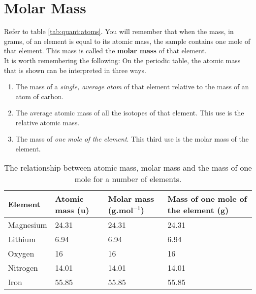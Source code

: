 



\section{Molar Mass}
\label{subsec:quant:mm}


Refer to table \ref{tab:quant:atoms}. You will remember that when the mass, in grams, of an element is equal to its atomic mass, the sample contains one mole of that element. This mass is called the \textbf{molar mass} of that element.\\

It is worth remembering the following: On the periodic table, the atomic mass that is shown can be interpreted in three ways.

\begin{enumerate}
\item{The mass of a \textit{single, average atom} of that element relative to the mass of an atom of carbon.}
\item{The average atomic mass of all the isotopes of that element. This use is the relative atomic mass.}
\item{The mass of \textit{one mole of the element}. This third use is the molar mass of the element.}
\end{enumerate}

\begin{table}[h]
\caption{The relationship between atomic mass, molar mass and the mass of one mole for a number of elements.}
\label{tab:mole summary}
\begin{center}
\begin{tabular}{|p{2cm}|p{2cm}|p{2cm}|p{2cm}|}\hline
\textbf{Element} & \textbf{Atomic mass (u)} & \textbf{Molar mass (g.mol$^{-1}$)} & \textbf{Mass of one mole of the element (g)} \\\hline
Magnesium & 24.31 & 24.31 & 24.31 \\\hline
Lithium & 6.94 & 6.94 & 6.94 \\\hline
Oxygen & 16 & 16 & 16 \\\hline
Nitrogen & 14.01 & 14.01 & 14.01 \\\hline
Iron & 55.85 & 55.85 & 55.85 \\\hline
\end{tabular}
\end{center}
\end{table}

